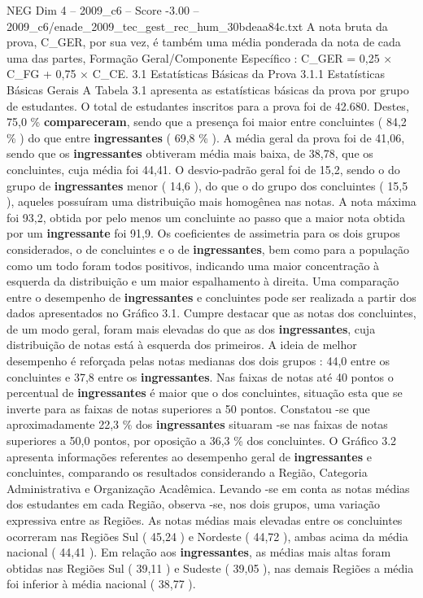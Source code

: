 \begin{textsample}{NEG Dim 4 – 2009\_c6 – Score -3.00 – 2009\_c6/enade\_2009\_tec\_gest\_rec\_hum\_30bdeaa84c.txt}
A nota bruta da prova, C\_GER, por sua vez, é também uma média ponderada da nota de cada uma das partes, Formação Geral/Componente Específico : C\_GER = 0,25 × C\_FG + 0,75 × C\_CE. 3.1 Estatísticas Básicas da Prova 3.1.1 Estatísticas Básicas Gerais A Tabela 3.1 apresenta as estatísticas básicas da prova por grupo de estudantes.
O total de estudantes inscritos para a prova foi de 42.680.
Destes, 75,0 \% \textbf{compareceram}, sendo que a presença foi maior entre concluintes ( 84,2 \% ) do que entre \textbf{ingressantes} ( 69,8 \% ).
A média geral da prova foi de 41,06, sendo que os \textbf{ingressantes} obtiveram média mais baixa, de 38,78, que os concluintes, cuja média foi 44,41.
O desvio-padrão geral foi de 15,2, sendo o do grupo de \textbf{ingressantes} menor ( 14,6 ), do que o do grupo dos concluintes ( 15,5 ), aqueles possuíram uma distribuição mais homogênea nas notas.
A nota máxima foi 93,2, obtida por pelo menos um concluinte ao passo que a maior nota obtida por um \textbf{ingressante} foi 91,9.
Os coeficientes de assimetria para os dois grupos considerados, o de concluintes e o de \textbf{ingressantes}, bem como para a população como um todo foram todos positivos, indicando uma maior concentração à esquerda da distribuição e um maior espalhamento à direita.
Uma comparação entre o desempenho de \textbf{ingressantes} e concluintes pode ser realizada a partir dos dados apresentados no Gráfico 3.1.
Cumpre destacar que as notas dos concluintes, de um modo geral, foram mais elevadas do que as dos \textbf{ingressantes}, cuja distribuição de notas está à esquerda dos primeiros.
A ideia de melhor desempenho é reforçada pelas notas medianas dos dois grupos : 44,0 entre os concluintes e 37,8 entre os \textbf{ingressantes}.
Nas faixas de notas até 40 pontos o percentual de \textbf{ingressantes} é maior que o dos concluintes, situação esta que se inverte para as faixas de notas superiores a 50 pontos.
Constatou -se que aproximadamente 22,3 \% dos \textbf{ingressantes} situaram -se nas faixas de notas superiores a 50,0 pontos, por oposição a 36,3 \% dos concluintes.
O Gráfico 3.2 apresenta informações referentes ao desempenho geral de \textbf{ingressantes} e concluintes, comparando os resultados considerando a Região, Categoria Administrativa e Organização Acadêmica.
Levando -se em conta as notas médias dos estudantes em cada Região, observa -se, nos dois grupos, uma variação expressiva entre as Regiões.
As notas médias mais elevadas entre os concluintes ocorreram nas Regiões Sul ( 45,24 ) e Nordeste ( 44,72 ), ambas acima da média nacional ( 44,41 ).
Em relação aos \textbf{ingressantes}, as médias mais altas foram obtidas nas Regiões Sul ( 39,11 ) e Sudeste ( 39,05 ), nas demais Regiões a média foi inferior à média nacional ( 38,77 ).

\end{textsample}

